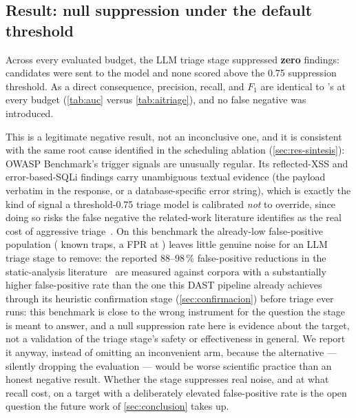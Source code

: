 \subsection{Result: null suppression under the default threshold}
\label{sec:ai-triage-result}

Across every evaluated budget, the LLM triage stage suppressed
\textbf{zero} findings: \ValorAITriageTotalTriaged{} candidates were sent to
the model and none scored above the \num{0.75} suppression threshold. As a
direct consequence,  precision, recall, and $F_1$ are
identical to 's at every budget (\cref{tab:auc} versus
\cref{tab:aitriage}), and no false negative was introduced.

This is a legitimate negative result, not an inconclusive one, and it is
consistent with the same root cause identified in the scheduling ablation
(\cref{sec:res-sintesis}): OWASP Benchmark's trigger signals are unusually
regular. Its reflected-XSS and error-based-SQLi findings carry unambiguous
textual evidence (the payload verbatim in the response, or a
database-specific error string), which is exactly the kind of signal a
threshold-\num{0.75} triage model is calibrated \emph{not} to override,
since doing so risks the false negative the related-work literature
identifies as the real cost of aggressive
triage~\cite{du2026reducing,ameen2026qasecclaw}. On this benchmark the
already-low false-positive population (\NumTrampas{} known traps, a
\ValorFPRBaseline{} FPR at ) leaves little genuine noise for
an LLM triage stage to remove: the reported 88--98\,\% false-positive
reductions in the static-analysis
literature~\cite{munson2025llmfriends,ameen2026qasecclaw,du2026reducing} are
measured against corpora with a substantially higher false-positive rate than
the one this DAST pipeline already achieves through its heuristic
confirmation stage (\cref{sec:confirmacion}) before triage ever runs: this
benchmark is close to the wrong instrument for the question the stage is
meant to answer, and a null suppression rate here is evidence about the
target, not a validation of the triage stage's safety or effectiveness in
general. We report it anyway, instead of omitting an inconvenient arm, because
the alternative --- silently dropping the evaluation --- would be worse
scientific practice than an honest negative result. Whether the stage
suppresses real noise, and at what recall cost, on a target with a
deliberately elevated false-positive rate is the open question the future
work of \cref{sec:conclusion} takes up.

